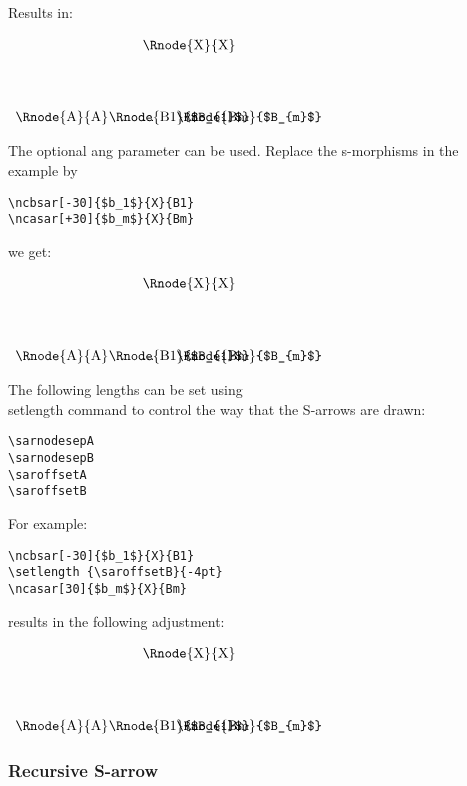 \documentclass[10pt,a4paper]{article}
\begin{document}
\noindent Results in:
\begin{center}
$
\begin{array}{p{2cm}p{0.5cm}p{0.5cm}p{0.5cm}}
& & \Rnode{X}{X}& \\ [1.4cm]
\Rnode{A}{A} & \Rnode{B1}{$B_{1}$} & ... & \Rnode{Bm}{$B_{m}$}\\
\end{array}
$
\end{center}
\noindent The optional ang parameter can be used. Replace the s-morphisms in the example by
\begin{verbatim}
\ncbsar[-30]{$b_1$}{X}{B1}
\ncasar[+30]{$b_m$}{X}{Bm}
\end{verbatim}
we get:
\begin{center}
$
\begin{array}{p{2cm}p{0.5cm}p{0.5cm}p{0.5cm}}
& & \Rnode{X}{X}& \\ [1.4cm]
\Rnode{A}{A} & \Rnode{B1}{$B_{1}$} & ... & \Rnode{Bm}{$B_{m}$}\\
\end{array}
$
\end{center}
\noindent The following lengths can be set using \\setlength command to control the way that the S-arrows are drawn:
\begin{verbatim}
\sarnodesepA
\sarnodesepB
\saroffsetA
\saroffsetB
\end{verbatim}
For example:
\begin{verbatim}
\ncbsar[-30]{$b_1$}{X}{B1}
\setlength {\saroffsetB}{-4pt}
\ncasar[30]{$b_m$}{X}{Bm}
\end{verbatim}
\indent results in the following adjustment:
\begin{center}
$
\begin{array}{p{2cm}p{0.5cm}p{0.5cm}p{0.5cm}}
& & \Rnode{X}{X}& \\ [1.4cm]
\Rnode{A}{A} & \Rnode{B1}{$B_{1}$} & ... & \Rnode{Bm}{$B_{m}$}\\
\end{array}
$
\setlength {\saroffsetB}{-4pt}
\end{center}

\subsubsection {Recursive S-arrow}
\end{document}
